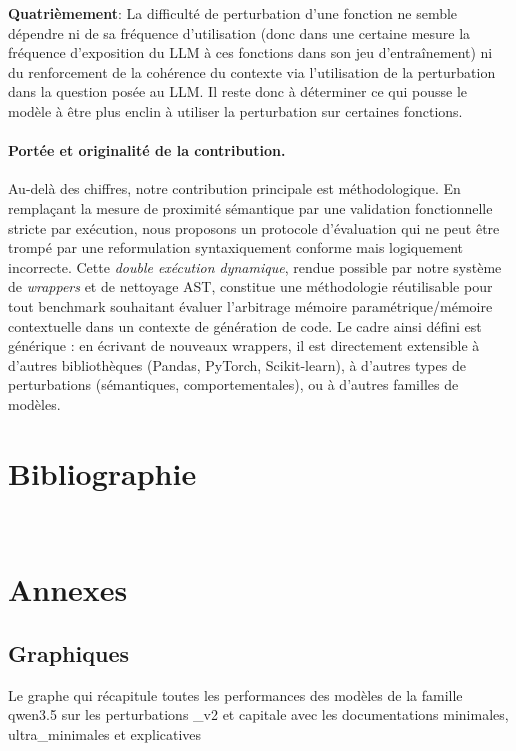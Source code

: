 \documentclass[11pt, a4paper]{article}
\begin{document}
\textbf{Quatrièmement}: La difficulté de perturbation d'une fonction ne semble dépendre ni de sa fréquence d'utilisation (donc dans une certaine mesure la fréquence d'exposition du LLM à ces fonctions dans son jeu d'entraînement) ni du renforcement de la cohérence du contexte via l'utilisation de la perturbation dans la question posée au LLM. Il reste donc à déterminer ce qui pousse le modèle à être plus enclin à utiliser la perturbation sur certaines fonctions.

\paragraph{Portée et originalité de la contribution.}

Au-delà des chiffres, notre contribution principale est méthodologique. En remplaçant la mesure de proximité sémantique par une validation fonctionnelle stricte par exécution, nous proposons un protocole d'évaluation qui ne peut être trompé par une reformulation syntaxiquement conforme mais logiquement incorrecte. Cette \textit{double exécution dynamique}, rendue possible par notre système de \textit{wrappers} et de nettoyage AST, constitue une méthodologie réutilisable pour tout benchmark souhaitant évaluer l'arbitrage mémoire paramétrique/mémoire contextuelle dans un contexte de génération de code. Le cadre ainsi défini est générique : en écrivant de nouveaux wrappers, il est directement extensible à d'autres bibliothèques (Pandas, PyTorch, Scikit-learn), à d'autres types de perturbations (sémantiques, comportementales), ou à d'autres familles de modèles.


\section{Bibliographie}

\printbibliography 

‌
\newpage

\appendix
\section{Annexes}

\subsection{Graphiques}\label{sec:graphs}

Le graphe qui récapitule toutes les performances des modèles de la famille qwen3.5 sur les perturbations \_v2 et capitale avec les documentations minimales, ultra\_minimales et explicatives
\end{document}
